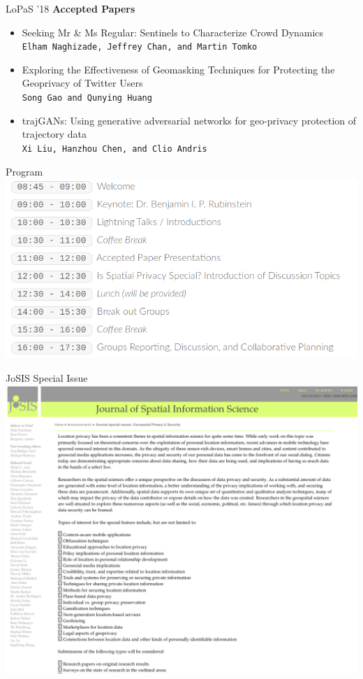 \documentclass[10pt]{beamer}
\begin{document}
	\begin{frame}{LoPaS '18}
		\textbf{Accepted Papers}
		\begin{itemize}
			\setlength\itemsep{1em}
			\item Seeking Mr \& Ms Regular: Sentinels to Characterize Crowd Dynamics\\
			\texttt{Elham Naghizade, Jeffrey Chan, and Martin Tomko}
			\item Exploring the Effectiveness of Geomasking Techniques for Protecting the Geoprivacy of Twitter Users\\
			\texttt{Song Gao and Qunying Huang}
			\item trajGANs: Using generative adversarial networks for geo-privacy protection of trajectory data\\
			\texttt{Xi Liu, Hanzhou Chen, and Clio Andris}
			
		\end{itemize}
	\end{frame}

	\begin{frame}{Program}
		\includegraphics[width=\textwidth]{figures/program.png}
	\end{frame}

	\begin{frame}{JoSIS Special Issue}
		\includegraphics[width=\textwidth]{figures/specialissue.png}
	\end{frame}
\end{document}
